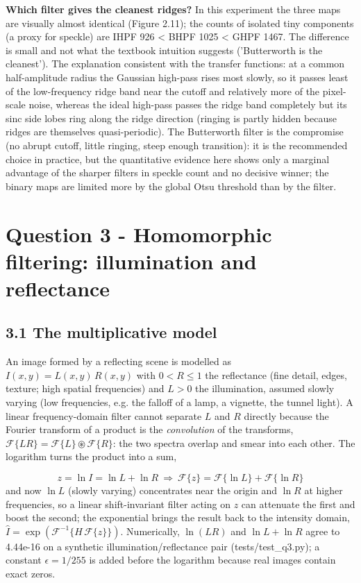\documentclass[10pt,a4paper]{article}
\begin{document}
\textbf{Which filter gives the cleanest ridges?} In this experiment the three maps are visually almost identical (Figure 2.11); the counts of isolated tiny components (a proxy for speckle) are IHPF 926 \textless{} BHPF 1025 \textless{} GHPF 1467. The difference is small and not what the textbook intuition suggests ('Butterworth is the cleanest'). The explanation consistent with the transfer functions: at a common half-amplitude radius the Gaussian high-pass rises most slowly, so it passes least of the low-frequency ridge band near the cutoff and relatively more of the pixel-scale noise, whereas the ideal high-pass passes the ridge band completely but its sinc side lobes ring along the ridge direction (ringing is partly hidden because ridges are themselves quasi-periodic). The Butterworth filter is the compromise (no abrupt cutoff, little ringing, steep enough transition): it is the recommended choice in practice, but the quantitative evidence here shows only a marginal advantage of the sharper filters in speckle count and no decisive winner; the binary maps are limited more by the global Otsu threshold than by the filter.

\section{Question 3 - Homomorphic filtering: illumination and reflectance}
\subsection{3.1 The multiplicative model}
An image formed by a reflecting scene is modelled as $I(x,y)=L(x,y)\,R(x,y)$ with $0<R\le1$ the reflectance (fine detail, edges, texture; high spatial frequencies) and $L>0$ the illumination, assumed slowly varying (low frequencies, e.g. the falloff of a lamp, a vignette, the tunnel light). A linear frequency-domain filter cannot separate $L$ and $R$ directly because the Fourier transform of a product is the \textit{convolution} of the transforms, $\mathcal F\{LR\}=\mathcal F\{L\}\circledast\mathcal F\{R\}$: the two spectra overlap and smear into each other. The logarithm turns the product into a sum,

\begin{equation}z=\ln I=\ln L+\ln R\ \Rightarrow\ \mathcal F\{z\}=\mathcal F\{\ln L\}+\mathcal F\{\ln R\}\end{equation}
and now $\ln L$ (slowly varying) concentrates near the origin and $\ln R$ at higher frequencies, so a linear shift-invariant filter acting on $z$ can attenuate the first and boost the second; the exponential brings the result back to the intensity domain, $\hat I=\exp(\mathcal F^{-1}\{H\,\mathcal F\{z\}\})$. Numerically, $\ln(LR)$ and $\ln L+\ln R$ agree to 4.44e-16 on a synthetic illumination/reflectance pair (tests/test\_q3.py); a constant $\epsilon=1/255$ is added before the logarithm because real images contain exact zeros.
\end{document}
